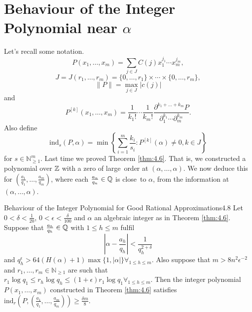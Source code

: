 \documentclass{Vorlesungstemplate_English} %
\renewcommand{\N}{\mathbb{N}_{\geq 1}}
\begin{document}
\section{Behaviour of the Integer Polynomial near $\alpha$}
Let's recall some notation.
\[ P(x_1, \dots, x_m) = \sum_{j \in J} C(j)x_1^{j_1}\cdots x_m^{j_m},\]
\[ J = J(r_1, \dots, r_m) = \{ 0, \dots, r_1\} \times \cdots \times \{ 0, \dots, r_m\},\]
\[ \|P\| = \max_{j \in J}|c(j)|\]
and
\[ P^{[k]}(x_1, \dots, x_m) = \frac{1}{k_1!}\cdots\frac{1}{k_m!}\frac{\partial^{k_1+\dots+k_m}P}{\partial_1^{k_1}\cdots\partial_m^{k_m}}.\]
Also define
\[ \text{ind}_{s}(P,\alpha) = \min\left\{ \sum_{i=1}^m \frac{k_i}{s_i}: P^{[k]}(\alpha) \neq 0, k \in J\right\}\]
for $s \in \N^m$. Last time we proved Theorem \ref{thm:4.6}. That is, we constructed a polynomial over $\mathbb{Z}$ with a zero of \glqq large\grqq \ order at $(\alpha, \dots, \alpha)$. We now deduce this for $\left(\frac{a_1}{q_1}, \dots, \frac{a_m}{q_m}\right)$, where each $\frac{a_n}{q_n} \in \mathbb{Q}$ is \glqq close\grqq \ to $\alpha$, from the information at $(\alpha, \dots, \alpha)$.
\begin{theorem}{Behaviour of the Integer Polynomial for Good Rational Approximations}{4.8}
  Let $0 < \delta < \frac{1}{20}$, $0 < \epsilon < \frac{\delta}{100}$ and $\alpha$ an algebraic integer as in Theorem \ref{thm:4.6}. Suppose that $\frac{a_h}{q_h} \in \mathbb{Q}$ with $1 \leq h \leq m$ fulfil
  \[ \left| \alpha - \frac{a_h}{q_h}\right| < \frac{1}{q_h^{2+\delta}}\]
  and $q_h^{\epsilon} > 64(H(\alpha)+1)\max\{ 1, |\alpha|\} \forall_{1 \leq h \leq m}$. Also suppose that  $m > 8n^2\epsilon^{-2}$ and $r_1, \dots, r_m \in \N$ are such that $r_1\log q_1 \leq r_h\log q_h \leq (1+\epsilon)r_1\log q_1 \forall_{1 \leq h \leq m}$. Then the integer polynomial $P(x_1, \dots, x_m)$ constructed in Theorem \ref{thm:4.6} satisfies $\text{ind}_r\left(P,\left(\frac{a_1}{q_1}, \dots, \frac{a_m}{q_m}\right)\right) \geq \frac{\delta m}{8}$.
\end{theorem}
\end{document}
